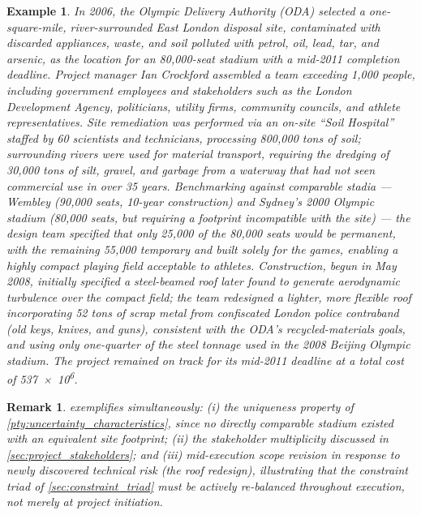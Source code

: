 \documentclass[12pt, a4paper]{report}
\theoremstyle{engnotes}
\newtheorem{remark}{Remark}[section]
\newtheorem{example}{Example}[section]
\begin{document}
\begin{example}\label{ex:london_olympic_stadium}
    In 2006, the Olympic Delivery Authority (ODA) selected a one-square-mile, river-surrounded East London disposal site, contaminated with discarded appliances, waste, and soil polluted with petrol, oil, lead, tar, and arsenic, as the location for an 80{,}000-seat stadium with a mid-2011 completion deadline. Project manager Ian Crockford assembled a team exceeding 1{,}000 people, including government employees and stakeholders such as the London Development Agency, politicians, utility firms, community councils, and athlete representatives. Site remediation was performed via an on-site ``Soil Hospital'' staffed by 60 scientists and technicians, processing 800{,}000 tons of soil; surrounding rivers were used for material transport, requiring the dredging of 30{,}000 tons of silt, gravel, and garbage from a waterway that had not seen commercial use in over 35 years. Benchmarking against comparable stadia --- Wembley (90{,}000 seats, 10-year construction) and Sydney's 2000 Olympic stadium (80{,}000 seats, but requiring a footprint incompatible with the site) --- the design team specified that only 25{,}000 of the 80{,}000 seats would be permanent, with the remaining 55{,}000 temporary and built solely for the games, enabling a highly compact playing field acceptable to athletes. Construction, begun in May 2008, initially specified a steel-beamed roof later found to generate aerodynamic turbulence over the compact field; the team redesigned a lighter, more flexible roof incorporating 52 tons of scrap metal from confiscated London police contraband (old keys, knives, and guns), consistent with the ODA's recycled-materials goals, and using only one-quarter of the steel tonnage used in the 2008 Beijing Olympic stadium. The project remained on track for its mid-2011 deadline at a total cost of \qty{537e6}{\pound}.
\end{example}

\begin{remark}
     exemplifies simultaneously: (i) the uniqueness property of \cref{pty:uncertainty_characteristics}, since no directly comparable stadium existed with an equivalent site footprint; (ii) the stakeholder multiplicity discussed in \cref{sec:project_stakeholders}; and (iii) mid-execution scope revision in response to newly discovered technical risk (the roof redesign), illustrating that the constraint triad of \cref{sec:constraint_triad} must be actively re-balanced throughout execution, not merely at project initiation.
\end{remark}
\end{document}

